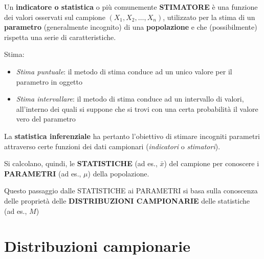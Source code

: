 \documentclass[
  ignorenonframetext,
  compress, aspectratio=149]{beamer}
\providecommand{\tightlist}{%
  \setlength{\itemsep}{0pt}\setlength{\parskip}{0pt}}
\begin{document}
\begin{frame}{}
\label{section-7}
Un \textbf{indicatore o statistica} o più comunemente \textbf{STIMATORE}
è una funzione dei valori osservati sul campione
\((X_1, X_2, \ldots, X_n)\), utilizzato per la stima di un
\textbf{parametro} (generalmente incognito) di una \textbf{popolazione}
e che (possibilmente) rispetta una serie di caratteristiche.

\vspace{3mm}

Stima:

\begin{itemize}
\tightlist
\item
  \emph{Stima puntuale}: il metodo di stima conduce ad un unico valore
  per il parametro in oggetto
\item
  \emph{Stima intervallare}: il metodo di stima conduce ad un intervallo
  di valori, all'interno dei quali si suppone che si trovi con una certa
  probabilità il valore vero del parametro
\end{itemize}
\end{frame}

\begin{frame}{}
\label{section-8}
La \textbf{statistica inferenziale} ha pertanto l'obiettivo di stimare
incogniti parametri attraverso certe funzioni dei dati campionari
(\emph{indicatori} o \emph{stimatori}).

\vspace{3mm}

Si calcolano, quindi, le \textbf{STATISTICHE} (ad es., \(\bar{x}\)) del
campione per conoscere i \textbf{PARAMETRI} (ad es., \(\mu\)) della
popolazione.

\vspace{3mm}

Questo passaggio dalle STATISTICHE ai PARAMETRI si basa sulla conoscenza
delle proprietà delle \textbf{DISTRIBUZIONI CAMPIONARIE} delle
statistiche (ad es., \(M\))
\end{frame}

\section{Distribuzioni campionarie}\label{distribuzioni-campionarie}
\end{document}
